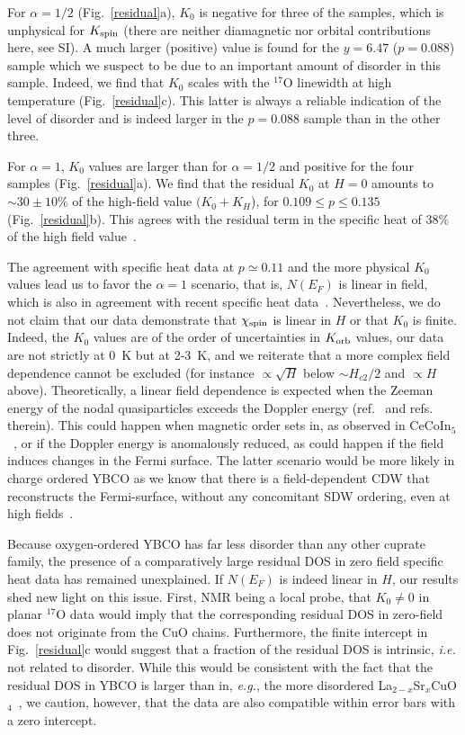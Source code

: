 \documentclass[superscriptaddress,twocolumn,prl,preprintnumbers,amsmath,amssymb]{revtex4}
\begin{document}
For $\alpha=1/2$ (Fig.~\ref{residual}a), $K_0$ is negative for three of the samples, which is unphysical for $K_{\rm spin}$ (there are neither diamagnetic nor orbital contributions here, see SI). A much larger (positive) value is found for the $y=6.47$ ($p=0.088$) sample which we suspect to be due to an important amount of disorder in this sample. Indeed, we find that $K_0$ scales with the $^{17}$O linewidth at high temperature (Fig.~\ref{residual}c). This latter is always a reliable indication of the level of disorder and is indeed larger in the $p=0.088$ sample than in the other three.

For $\alpha=1$, $K_0$ values are larger than for $\alpha=1/2$ and positive for the four samples (Fig.~\ref{residual}a). We find that the residual $K_0$ at $H=0$ amounts to $\sim30\pm10\%$ of the high-field value $(K_0+K_H$), for $0.109 \leq p \leq 0.135$ (Fig.~\ref{residual}b). This agrees with the residual term in the specific heat of 38\% of the high field value~\cite{Marcenat15}.

The agreement with specific heat data at $p\simeq 0.11$ and the more physical $K_0$ values lead us to favor the $\alpha=1$ scenario, that is, $N(E_F)$ is linear in field, which is also in agreement with recent specific heat data~\cite{Marcenat15}. Nevertheless, we do not claim that our data demonstrate that $\chi_{\rm spin}$ is linear in $H$ or that $K_0$ is finite. Indeed, the $K_0$ values are of the order of uncertainties in $K_{\rm orb}$ values, our data are not strictly at 0~K but at 2-3~K, and we reiterate that a more complex field dependence cannot be excluded (for instance $\propto \sqrt{H}$ below $\sim H_{c2}/2$ and $\propto H$ above). Theoretically, a linear field dependence is expected when the Zeeman energy of the nodal quasiparticles exceeds the Doppler energy (ref.~\cite{Vekhter01} and refs. therein). This could happen when magnetic order sets in, as observed in CeCoIn$_5$~\cite{Koutroulakis08}, or if the Doppler energy is anomalously reduced, as could happen if the field induces changes in the Fermi surface. The latter scenario would be more likely in charge ordered YBCO as we know that there is a field-dependent CDW that reconstructs the Fermi-surface, without any concomitant SDW ordering, even at high fields~\cite{Wu11,Wu13}.

Because oxygen-ordered YBCO has far less disorder than any other cuprate family, the presence of a comparatively large residual DOS in zero field specific heat data has remained unexplained. If $N(E_F)$ is indeed linear in $H$, our results shed new light on this issue. First, NMR being a local probe, that $K_0 \neq 0$ in planar $^{17}$O data would imply that the corresponding residual DOS in zero-field does not originate from the CuO chains. Furthermore, the finite intercept in Fig.~\ref{residual}c would suggest that a fraction of the residual DOS is intrinsic, {\it i.e.} not related to disorder. While this would be consistent with the fact that the residual DOS in YBCO is larger than in, {\it e.g.}, the more disordered La$_{2-x}$Sr$_x$CuO$_4$~\cite{Riggs11}, we caution, however, that the data are also compatible within error bars with a zero intercept.
\end{document}
